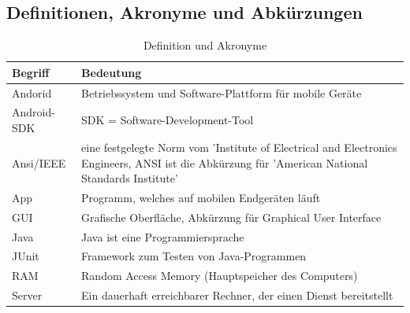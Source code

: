 \documentclass[fontsize=12pt,paper=a4,twoside]{scrartcl}
\begin{document}
\subsection{Definitionen, Akronyme und Abkürzungen} \label{subsec:Def} 
\begin{table}
	[H] \label{tab:Def} \caption{Definition und Akronyme} \centering 
	\begin{tabular}
		{p{7cm}|p{7cm}} \hline Begriff & Bedeutung\\
		\hline \hline Andorid & Betriebssystem und Software-Plattform für mobile Geräte\\
		\hline Android-SDK & SDK = Software-Development-Tool\\
		\hline Ansi/IEEE & eine festgelegte Norm vom 'Institute of Electrical and Electronics Engineers, ANSI ist die Abkürzung für 'American National Standards Institute'\\
		\hline App & Programm, welches auf mobilen Endgeräten läuft\\
		\hline GUI & Grafische Oberfläche, Abkürzung für Graphical User Interface\\
		\hline Java & Java ist eine Programmiersprache\\
		\hline JUnit & Framework zum Testen von Java-Programmen\\
		\hline RAM & Random Access Memory (Hauptspeicher des Computers)\\
		\hline Server & Ein dauerhaft erreichbarer Rechner, der einen Dienst bereitstellt\\
		\hline 
	\end{tabular}
\end{table}
\end{document}

